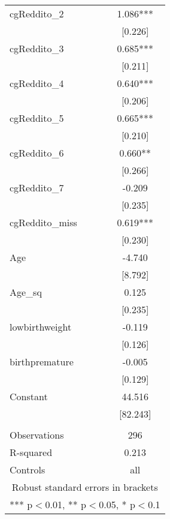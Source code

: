 \documentclass[]{article}
\begin{document}
\begin{tabular}{lc}
cgReddito\_2 & 1.086*** \\
 & [0.226] \\
cgReddito\_3 & 0.685*** \\
 & [0.211] \\
cgReddito\_4 & 0.640*** \\
 & [0.206] \\
cgReddito\_5 & 0.665*** \\
 & [0.210] \\
cgReddito\_6 & 0.660** \\
 & [0.266] \\
cgReddito\_7 & -0.209 \\
 & [0.235] \\
cgReddito\_miss & 0.619*** \\
 & [0.230] \\
Age & -4.740 \\
 & [8.792] \\
Age\_sq & 0.125 \\
 & [0.235] \\
lowbirthweight & -0.119 \\
 & [0.126] \\
birthpremature & -0.005 \\
 & [0.129] \\
Constant & 44.516 \\
 & [82.243] \\
 &  \\
Observations & 296 \\
R-squared & 0.213 \\
 Controls & all \\ \hline
\multicolumn{2}{c}{ Robust standard errors in brackets} \\
\multicolumn{2}{c}{ *** p$<$0.01, ** p$<$0.05, * p$<$0.1} \\
\end{tabular}
\end{document}

